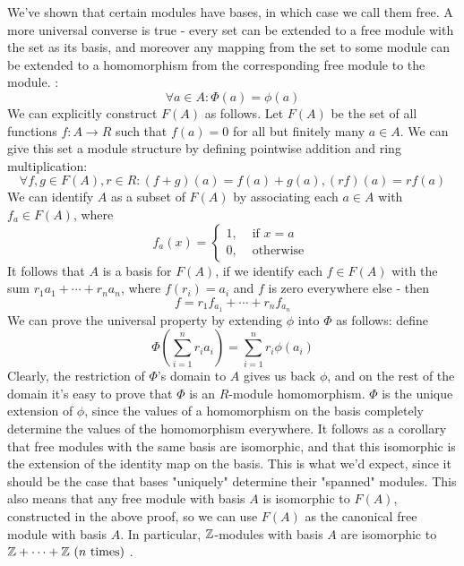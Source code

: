 \documentclass{article}
\begin{document}
\n
We've shown that certain modules have bases, in which case we call them free. A more universal converse is true - every set can be extended to a free module with the set as its basis, and moreover any mapping from the set to some module can be extended to a homomorphism from the corresponding free module to the module.
\nn
{}: 
$$ \forall a \in A: \Phi(a) = \phi(a) $$
\Pf We can explicitly construct $ F(A) $ as follows. Let $ F(A) $ be the set of all functions $ f: A \rightarrow R $ such that $ f(a) = 0 $ for all but finitely many $ a \in A $. We can give this set a module structure by defining pointwise addition and ring multiplication:
$$ \forall f, g \in F(A), r \in R: (f + g)(a) = f(a) + g(a), (r f)(a) = r f(a) $$
We can identify $ A $ as a subset of $ F(A) $ by associating each $ a \in A $ with $ f_a \in F(A) $, where
$$ f_a(x) = \begin{cases}
    1, &\text{ if } x = a \\
    0, &\text{ otherwise }
\end{cases} $$
It follows that $ A $ is a basis for $ F(A) $, if we identify each $ f \in F(A) $ with the sum $ r_1 a_1 + \cdots + r_n a_n $, where $ f(r_i) = a_i $ and $ f $ is zero everywhere else - then
$$ f = r_1 f_{a_1} + \cdots + r_n f_{a_n} $$
We can prove the universal property by extending $ \phi $ into $ \Phi $ as follows: define
$$ \Phi \left( \sum_{i = 1}^n r_i a_i \right) = \sum_{i = 1}^n r_i \phi(a_i) $$
Clearly, the restriction of $ \Phi $'s domain to $ A $ gives us back $ \phi $, and on the rest of the domain it's easy to prove that $ \Phi $ is an $ R $-module homomorphism. $ \Phi $ is the unique extension of $ \phi $, since the values of a homomorphism on the basis completely determine the values of the homomorphism everywhere. \qedsymbol
\nn
It follows as a corollary that free modules with the same basis are isomorphic, and that this isomorphic is the extension of the identity map on the basis. This is what we'd expect, since it should be the case that bases "uniquely" determine their "spanned" modules. This also means that any free module with basis $ A $ is isomorphic to $ F(A) $, constructed in the above proof, so we can use $ F(A) $ as the canonical free module with basis $ A $. In particular, $ \mathbb{Z} $-modules with basis $ A $ are isomorphic to $ \mathbb{Z} + \cdots + \mathbb{Z} \text{ ($ n $ times) } $.
\end{document}
